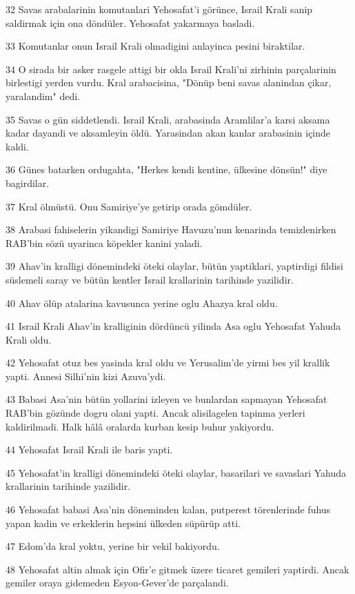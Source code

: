 \par 32 Savas arabalarinin komutanlari Yehosafat'i görünce, Israil Krali sanip saldirmak için ona döndüler. Yehosafat yakarmaya basladi.
\par 33 Komutanlar onun Israil Krali olmadigini anlayinca pesini biraktilar.
\par 34 O sirada bir asker rasgele attigi bir okla Israil Krali'ni zirhinin parçalarinin birlestigi yerden vurdu. Kral arabacisina, "Dönüp beni savas alanindan çikar, yaralandim" dedi.
\par 35 Savas o gün siddetlendi. Israil Krali, arabasinda Aramlilar'a karsi aksama kadar dayandi ve aksamleyin öldü. Yarasindan akan kanlar arabasinin içinde kaldi.
\par 36 Günes batarken ordugahta, "Herkes kendi kentine, ülkesine dönsün!" diye bagirdilar.
\par 37 Kral ölmüstü. Onu Samiriye'ye getirip orada gömdüler.
\par 38 Arabasi fahiselerin yikandigi Samiriye Havuzu'nun kenarinda temizlenirken RAB'bin sözü uyarinca köpekler kanini yaladi.
\par 39 Ahav'in kralligi dönemindeki öteki olaylar, bütün yaptiklari, yaptirdigi fildisi süslemeli saray ve bütün kentler Israil krallarinin tarihinde yazilidir.
\par 40 Ahav ölüp atalarina kavusunca yerine oglu Ahazya kral oldu.
\par 41 Israil Krali Ahav'in kralliginin dördüncü yilinda Asa oglu Yehosafat Yahuda Krali oldu.
\par 42 Yehosafat otuz bes yasinda kral oldu ve Yerusalim'de yirmi bes yil krallik yapti. Annesi Silhi'nin kizi Azuva'ydi.
\par 43 Babasi Asa'nin bütün yollarini izleyen ve bunlardan sapmayan Yehosafat RAB'bin gözünde dogru olani yapti. Ancak alisilagelen tapinma yerleri kaldirilmadi. Halk hâlâ oralarda kurban kesip buhur yakiyordu.
\par 44 Yehosafat Israil Krali ile baris yapti.
\par 45 Yehosafat'in kralligi dönemindeki öteki olaylar, basarilari ve savaslari Yahuda krallarinin tarihinde yazilidir.
\par 46 Yehosafat babasi Asa'nin döneminden kalan, putperest törenlerinde fuhus yapan kadin ve erkeklerin hepsini ülkeden süpürüp atti.
\par 47 Edom'da kral yoktu, yerine bir vekil bakiyordu.
\par 48 Yehosafat altin almak için Ofir'e gitmek üzere ticaret gemileri yaptirdi. Ancak gemiler oraya gidemeden Esyon-Gever'de parçalandi.
